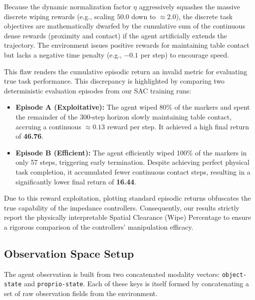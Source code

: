 \documentclass[letterpaper, 10 pt, conference]{IEEEtran}
\begin{document}
Because the dynamic normalization factor $\eta$ aggressively squashes the massive discrete wiping rewards (e.g., scaling $50.0$ down to $\approx 2.0$), the discrete task objectives are mathematically dwarfed by the cumulative sum of the continuous dense rewards (proximity and contact) if the agent artificially extends the trajectory. The environment issues positive rewards for maintaining table contact but lacks a negative time penalty (e.g., $-0.1$ per step) to encourage speed.

This flaw renders the cumulative episodic return an invalid metric for evaluating true task performance. This discrepancy is highlighted by comparing two deterministic evaluation episodes from our SAC training runs:
\begin{itemize}
    \item \textbf{Episode A (Exploitative):} The agent wiped 80\% of the markers and spent the remainder of the 300-step horizon slowly maintaining table contact, accruing a continuous $\approx 0.13$ reward per step. It achieved a high final return of \textbf{46.76}.
    \item \textbf{Episode B (Efficient):} The agent efficiently wiped 100\% of the markers in only 57 steps, triggering early termination. Despite achieving perfect physical task completion, it accumulated fewer continuous contact steps, resulting in a significantly lower final return of \textbf{16.44}.
\end{itemize}

Due to this reward exploitation, plotting standard episodic returns obfuscates the true capability of the impedance controllers. Consequently, our results strictly report the physically interpretable Spatial Clearance (Wipe) Percentage to ensure a rigorous comparison of the controllers' manipulation efficacy.

\subsection{Observation Space Setup}
\label{sec:obs-setup}

The agent observation is built from two concatenated modality vectors: \texttt{object-state} and \texttt{proprio-state}. Each of these keys is itself formed by concatenating a set of raw observation fields from the environment.
\end{document}
